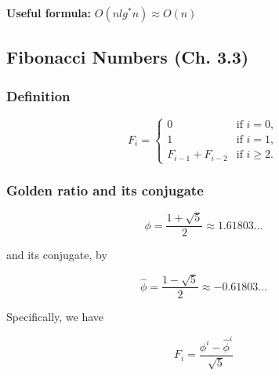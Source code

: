         \begin{intuition}
            
            \textbf{Useful formula:} $O(nlg^* n) \approx O(n)$
        \end{intuition}

\subsection{Fibonacci Numbers (Ch. 3.3)}
    \subsubsection{Definition}
        \begin{definition}
            \begin{equation}
                F_i = 
                \begin{cases}
                    0 & \text{if } i = 0, \\
                    1 & \text{if } i = 1, \\
                    F_{i-1} + F_{i-2} & \text{if } i \geq 2.
                \end{cases}
            \end{equation}
        \end{definition}
    
    \subsubsection{Golden ratio and its conjugate}
        \begin{definition}
            \begin{equation}
                \phi = \frac{1 + \sqrt{5}}{2} \approx 1.61803\ldots \label{eq:phi}
            \end{equation}
            
            and its conjugate, by
            
            \begin{equation}
                \hat{\phi} = \frac{1 - \sqrt{5}}{2} \approx -0.61803\ldots \label{eq:phihat}
            \end{equation}
            
            Specifically, we have
            
            \begin{equation}
                F_i = \frac{\phi^i - \hat{\phi}^i}{\sqrt{5}} \label{eq:fibonacci}
            \end{equation}
            
        \end{definition}

